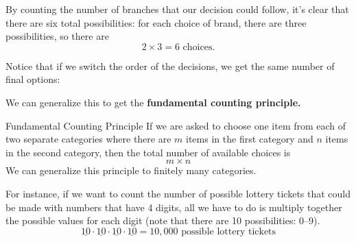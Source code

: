 By counting the number of branches that our decision could follow, it's clear that there are six total possibilities: for each choice of brand, there are three possibilities, so there are \[2 \times 3 = 6 \textrm{ choices}.\]  

Notice that if we switch the order of the decisions, we get the same number of final options:

\begin{center}
\end{center}

We can generalize this to get the \textbf{fundamental counting principle.}

\begin{proc}{Fundamental Counting Principle}
If we are asked to choose one item from each of two separate categories where there are $m$ items in the first category and $n$ items in the second category, then the total number of available choices is \[ m \times n \]
We can generalize this principle to finitely many categories. 
\end{proc}

For instance, if we want to count the number of possible lottery tickets that could be made with numbers that have 4 digits, all we have to do is multiply together the possible values for each digit (note that there are 10 possibilities: 0--9).
\[\underline{10} \cdot \underline{10} \cdot \underline{10} \cdot \underline{10} = 10,000 \textrm{ possible lottery tickets}\]

